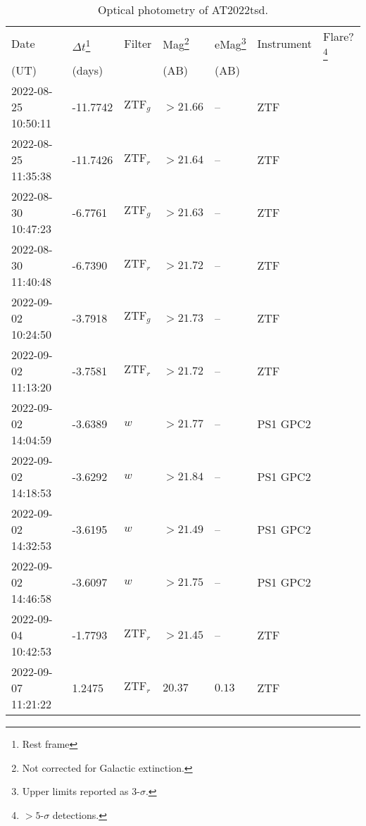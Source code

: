 \documentclass{nature_plusfigure}
\begin{document}
\clearpage

\begin{supplement}

\renewcommand{\thefigure}{Supplementary Information Figure~\arabic{figure}}
\renewcommand{\figurename}{}
\setcounter{figure}{0}
%


\renewcommand{\thetable}{Supplementary Information Table~\arabic{table}}
 \renewcommand{\tablename}{}
\setcounter{table}{0}

\begin{center} 
\begin{longtable}{lllllll} 
\caption{Optical photometry of AT2022tsd.} 
\label{tab:optical-photometry}\\ 
\hline\hline
Date & $\Delta t$\footnote{Rest frame} & Filter & Mag\footnote{Not corrected for Galactic extinction.} & eMag\footnote{Upper limits reported as 3-$\sigma$.} & Instrument & Flare?\footnote{$>5$-$\sigma$ detections.}\\ 
(UT) & (days) &  & (AB) & (AB) &  & \\ 
\hline
2022-08-25 10:50:11 & -11.7742 & $\mathrm{ZTF}_{g}$ & $>21.66$ & -- & ZTF &  \\ 
2022-08-25 11:35:38 & -11.7426 & $\mathrm{ZTF}_{r}$ & $>21.64$ & -- & ZTF &  \\ 
2022-08-30 10:47:23 & -6.7761 & $\mathrm{ZTF}_{g}$ & $>21.63$ & -- & ZTF &  \\ 
2022-08-30 11:40:48 & -6.7390 & $\mathrm{ZTF}_{r}$ & $>21.72$ & -- & ZTF &  \\ 
2022-09-02 10:24:50 & -3.7918 & $\mathrm{ZTF}_{g}$ & $>21.73$ & -- & ZTF &  \\ 
2022-09-02 11:13:20 & -3.7581 & $\mathrm{ZTF}_{r}$ & $>21.72$ & -- & ZTF &  \\ 
2022-09-02 14:04:59 & -3.6389 & $w$ & $>21.77$ & -- & PS1 GPC2 &  \\ 
2022-09-02 14:18:53 & -3.6292 & $w$ & $>21.84$ & -- & PS1 GPC2 &  \\ 
2022-09-02 14:32:53 & -3.6195 & $w$ & $>21.49$ & -- & PS1 GPC2 &  \\ 
2022-09-02 14:46:58 & -3.6097 & $w$ & $>21.75$ & -- & PS1 GPC2 &  \\ 
2022-09-04 10:42:53 & -1.7793 & $\mathrm{ZTF}_{r}$ & $>21.45$ & -- & ZTF &  \\ 
2022-09-07 11:21:22 & 1.2475 & $\mathrm{ZTF}_{r}$ & $20.37$ & $0.13$ & ZTF &  \\ 

\end{longtable}
\end{center}
\end{supplement}
\end{document}
